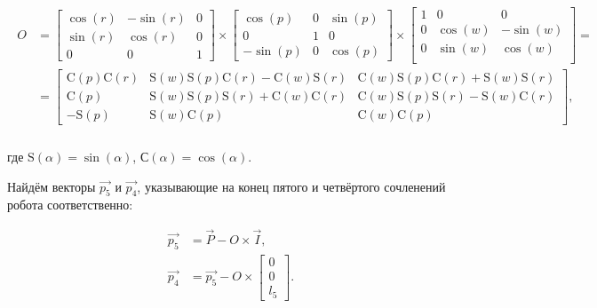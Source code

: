 \begin{gather*}
    \begin{split}
        O &=
        \begin{bmatrix}
            \cos(r) & -\sin(r) & 0 \\
            \sin(r) & \cos(r)  & 0 \\
            0       & 0        & 1
        \end{bmatrix} \times
        \begin{bmatrix}
            \cos(p)  & 0 & \sin(p) \\
            0        & 1 & 0       \\
            -\sin(p) & 0 & \cos(p)
        \end{bmatrix} \times
        \begin{bmatrix}
            1 & 0       & 0        \\
            0 & \cos(w) & -\sin(w) \\
            0 & \sin(w) & \cos(w)  \\
        \end{bmatrix} = \\
        &=
        \begin{bmatrix}
            \text{C}(p) \text{C}(r) & \text{S}(w) \text{S}(p) \text{C}(r) - \text{C}(w) \text{S}(r) & \text{C}(w) \text{S}(p) \text{C}(r) + \text{S}(w) \text{S}(r) \\
            \text{C}(p)             & \text{S}(w) \text{S}(p) \text{S}(r) + \text{C}(w) \text{C}(r) & \text{C}(w) \text{S}(p) \text{S}(r) - \text{S}(w) \text{C}(r) \\
            - \text{S}(p)           & \text{S}(w) \text{C}(p)                                       & \text{C}(w) \text{C}(p)
        \end{bmatrix},
    \end{split}
\end{gather*} \\
где $\text{S}(\alpha) = \sin(\alpha)$, $\text{С}(\alpha) = \cos(\alpha)$.

Найдём векторы $\overrightarrow{p_5}$ и $\overrightarrow{p_4}$, указывающие на конец пятого и четвёртого сочленений робота соответственно:

\begin{align*}
    \overrightarrow{p_5} &= \overrightarrow{P} - O \times \overrightarrow{I}, \\
    \overrightarrow{p_4} &= \overrightarrow{p_5} - O \times
    \begin{bmatrix}
        0 \\
        0 \\
        l_5
    \end{bmatrix}.
\end{align*} \\

